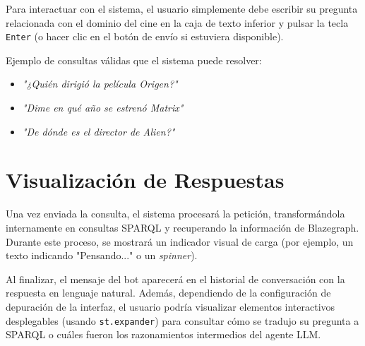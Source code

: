 Para interactuar con el sistema, el usuario simplemente debe escribir su pregunta relacionada con el dominio del cine en la caja de texto inferior y pulsar la tecla \texttt{Enter} (o hacer clic en el botón de envío si estuviera disponible).

Ejemplo de consultas válidas que el sistema puede resolver:
\begin{itemize}
    \item \textit{"¿Quién dirigió la película Origen?"}
    \item \textit{"Dime en qué año se estrenó Matrix"}
    \item \textit{"De dónde es el director de Alien?"}
\end{itemize}

\section{Visualización de Respuestas}

Una vez enviada la consulta, el sistema procesará la petición, transformándola internamente en consultas SPARQL y recuperando la información de Blazegraph. Durante este proceso, se mostrará un indicador visual de carga (por ejemplo, un texto indicando "Pensando..." o un \textit{spinner}).

Al finalizar, el mensaje del bot aparecerá en el historial de conversación con la respuesta en lenguaje natural. Además, dependiendo de la configuración de depuración de la interfaz, el usuario podría visualizar elementos interactivos desplegables (usando \texttt{st.expander}) para consultar cómo se tradujo su pregunta a SPARQL o cuáles fueron los razonamientos intermedios del agente LLM.

